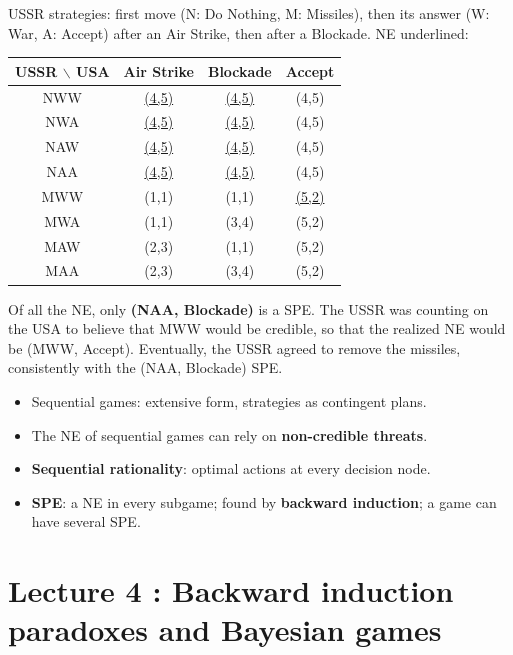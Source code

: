 \documentclass[11pt,a4paper,openany]{book}
\begin{document}
\begin{propbox}[title=NE and SPE]
USSR strategies: first move (N: Do Nothing, M: Missiles), then its answer (W: War, A:
Accept) after an Air Strike, then after a Blockade. NE underlined:
\begin{center}
\begin{tabular}{c|ccc}
USSR $\backslash$ USA & Air Strike & Blockade & Accept \\ \hline
NWW & \underline{(4,5)} & \underline{(4,5)} & (4,5) \\
NWA & \underline{(4,5)} & \underline{(4,5)} & (4,5) \\
NAW & \underline{(4,5)} & \underline{(4,5)} & (4,5) \\
NAA & \underline{(4,5)} & \underline{(4,5)} & (4,5) \\
MWW & (1,1) & (1,1) & \underline{(5,2)} \\
MWA & (1,1) & (3,4) & (5,2) \\
MAW & (2,3) & (1,1) & (5,2) \\
MAA & (2,3) & (3,4) & (5,2)
\end{tabular}
\end{center}
Of all the NE, only \textbf{(NAA, Blockade)} is a SPE. The USSR was counting on the USA to
believe that MWW would be credible, so that the realized NE would be (MWW, Accept).
Eventually, the USSR agreed to remove the missiles, consistently with the (NAA, Blockade)
SPE.
\end{propbox}

\begin{keybox}[title=Summary]
\begin{itemize}
  \item Sequential games: extensive form, strategies as contingent plans.
  \item The NE of sequential games can rely on \textbf{non-credible threats}.
  \item \textbf{Sequential rationality}: optimal actions at every decision node.
  \item \textbf{SPE}: a NE in every subgame; found by \textbf{backward induction}; a game can
        have several SPE.
\end{itemize}
\end{keybox}


\chapter{Lecture 4 : Backward induction paradoxes and Bayesian games}
\end{document}
